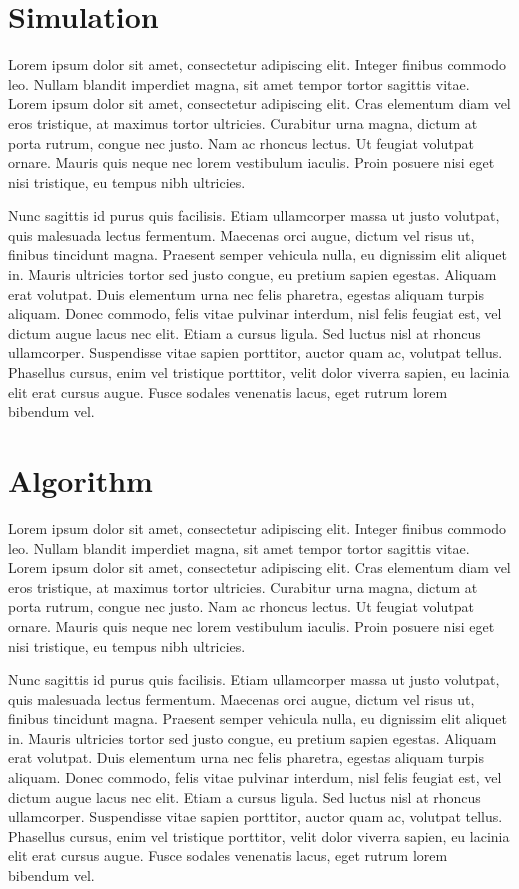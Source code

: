 \documentclass[
  digital,     %
  oneside,     %
  nosansbold,  %
  nocolorbold, %
  lof,         %
  lot,         %
]{fithesis4}
\begin{document}
\section{Simulation}
Lorem ipsum dolor sit amet, consectetur adipiscing elit. Integer finibus commodo leo. Nullam blandit imperdiet magna, sit amet tempor tortor sagittis vitae. Lorem ipsum dolor sit amet, consectetur adipiscing elit. Cras elementum diam vel eros tristique, at maximus tortor ultricies. Curabitur urna magna, dictum at porta rutrum, congue nec justo. Nam ac rhoncus lectus. Ut feugiat volutpat ornare. Mauris quis neque nec lorem vestibulum iaculis. Proin posuere nisi eget nisi tristique, eu tempus nibh ultricies.

Nunc sagittis id purus quis facilisis. Etiam ullamcorper massa ut justo volutpat, quis malesuada lectus fermentum. Maecenas orci augue, dictum vel risus ut, finibus tincidunt magna. Praesent semper vehicula nulla, eu dignissim elit aliquet in. Mauris ultricies tortor sed justo congue, eu pretium sapien egestas. Aliquam erat volutpat. Duis elementum urna nec felis pharetra, egestas aliquam turpis aliquam. Donec commodo, felis vitae pulvinar interdum, nisl felis feugiat est, vel dictum augue lacus nec elit. Etiam a cursus ligula. Sed luctus nisl at rhoncus ullamcorper. Suspendisse vitae sapien porttitor, auctor quam ac, volutpat tellus. Phasellus cursus, enim vel tristique porttitor, velit dolor viverra sapien, eu lacinia elit erat cursus augue. Fusce sodales venenatis lacus, eget rutrum lorem bibendum vel.

\section{Algorithm}
Lorem ipsum dolor sit amet, consectetur adipiscing elit. Integer finibus commodo leo. Nullam blandit imperdiet magna, sit amet tempor tortor sagittis vitae. Lorem ipsum dolor sit amet, consectetur adipiscing elit. Cras elementum diam vel eros tristique, at maximus tortor ultricies. Curabitur urna magna, dictum at porta rutrum, congue nec justo. Nam ac rhoncus lectus. Ut feugiat volutpat ornare. Mauris quis neque nec lorem vestibulum iaculis. Proin posuere nisi eget nisi tristique, eu tempus nibh ultricies.

Nunc sagittis id purus quis facilisis. Etiam ullamcorper massa ut justo volutpat, quis malesuada lectus fermentum. Maecenas orci augue, dictum vel risus ut, finibus tincidunt magna. Praesent semper vehicula nulla, eu dignissim elit aliquet in. Mauris ultricies tortor sed justo congue, eu pretium sapien egestas. Aliquam erat volutpat. Duis elementum urna nec felis pharetra, egestas aliquam turpis aliquam. Donec commodo, felis vitae pulvinar interdum, nisl felis feugiat est, vel dictum augue lacus nec elit. Etiam a cursus ligula. Sed luctus nisl at rhoncus ullamcorper. Suspendisse vitae sapien porttitor, auctor quam ac, volutpat tellus. Phasellus cursus, enim vel tristique porttitor, velit dolor viverra sapien, eu lacinia elit erat cursus augue. Fusce sodales venenatis lacus, eget rutrum lorem bibendum vel.
\end{document}

